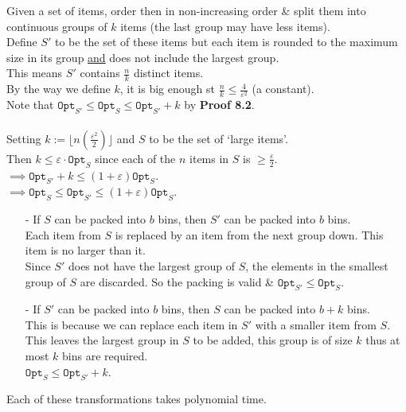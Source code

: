 \documentclass[11pt,a4paper]{article}
\begin{document}
Given a set of items, order then in non-increasing order \& split them into continuous groups of $k$ items (the last group may have less items).\\
Define $S'$ to be the set of these items but each item is rounded to the maximum size in its group \underline{and} does not include the largest group.\\
This means $S'$ contains $\frac{n}k$ distinct items.\\
By the way we define $k$, it is big enough st $\frac{n}k\leq\frac4{\varepsilon^2}$ (a constant).\\
Note that $\mathtt{Opt}_{S'}\leq \mathtt{Opt}_S\leq \mathtt{Opt}_{S'}+k$ by \textbf{Proof 8.2}.\\
\\
Setting $k:=\lfloor n(\frac{\varepsilon^2}2)\rfloor$ and $S$ to be the set of `large items'.\\
Then $k\leq\varepsilon\cdot\mathtt{Opt}_S$ since each of the $n$ items in $S$ is $\geq\frac\varepsilon2$.\\
$\implies\mathtt{Opt}_{S'}+k\leq(1+\varepsilon)\mathtt{Opt}_S$.\\
$\implies\mathtt{Opt}_S\leq\mathtt{Opt}_{S'}\leq(1+\varepsilon)\mathtt{Opt}_S$.\\

\begin{itemize}
	\item[-] If $S$ can be packed into $b$ bins, then $S'$ can be packed into $b$ bins.\\
	Each item from $S$ is replaced by an item from the next group down. This item is no larger than it.\\
	Since $S'$ does not have the largest group of $S$, the elements in the smallest group of $S$ are discarded.
	So the packing is valid \& $\mathtt{Opt}_{S'}\leq\mathtt{Opt}_S$.
	\item[-] If $S'$ can be packed into $b$ bins, then $S$ can be packed into $b+k$ bins.\\
	This is because we can replace each item in $S'$ with a smaller item from $S$.\\
	This leaves the largest group in $S$ to be added, this group is of size $k$ thus at most $k$ bins are required.\\
	$\mathtt{Opt}_S\leq\mathtt{Opt}_{S'}+k$.
\end{itemize}
\nb Each of these transformations takes polynomial time.\\
\end{document}
